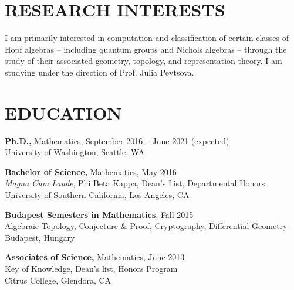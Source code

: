 \documentclass[margin, 10pt]{res} %
\begin{document}
\begin{resume}

 
\section{RESEARCH INTERESTS}  

I am primarily interested in computation and classification of certain classes of 
Hopf algebras -- including quantum groups and Nichols algebras -- through the study of their
associated geometry, topology, and representation theory. I am studying under the direction of 
Prof. Julia Pevtsova.


\section{EDUCATION}

{\bf Ph.D.,} Mathematics, September 2016 -- June 2021 (expected) \\
University of Washington, Seattle, WA

{\bf Bachelor of Science,} Mathematics, May 2016 \\
{\sl Magna Cum Laude}, Phi Beta Kappa, Dean's List, Departmental Honors \\
University of Southern California, Los Angeles, CA 

{\bf Budapest Semesters in Mathematics}, Fall 2015 \\
Algebraic Topology, Conjecture \& Proof, Cryptography, Differential Geometry  \\
Budapest, Hungary 

{\bf Associates of Science,} Mathematics, June 2013\\
Key of Knowledge, Dean's list, Honors Program \\
Citrus College, Glendora, CA 
 


\end{resume}
\end{document}
